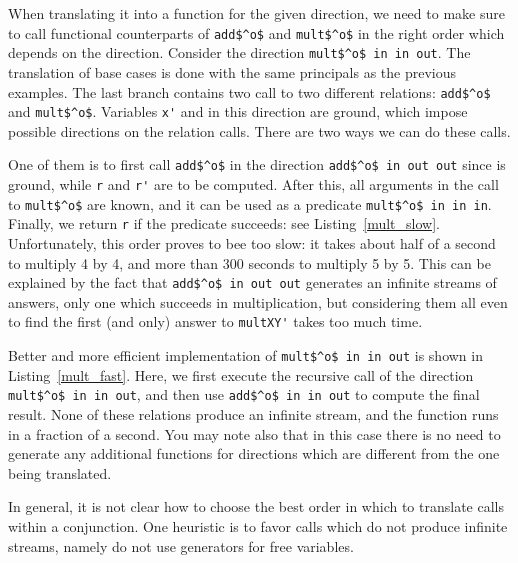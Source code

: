When translating it into a function for the given direction, we need to make sure to call functional counterparts of \lstinline{add$^o$} and \lstinline{mult$^o$} in the right order which depends on the direction.
Consider the direction \lstinline{mult$^o$ in in out}.
The translation of base cases is done with the same principals as the previous examples.
The last \conde branch contains two call to two different relations: \lstinline{add$^o$} and \lstinline{mult$^o$}.
Variables \lstinline{x'} and \y in this direction are ground, which impose possible directions on the relation calls.
There are two ways we can do these calls.

One of them is to first call \lstinline{add$^o$} in the direction \lstinline{add$^o$ in out out} since \y is ground, while \lstinline{r} and \lstinline{r'} are to be computed.
After this, all arguments in the call to \lstinline{mult$^o$} are known, and it can be used as a predicate \lstinline{mult$^o$ in in in}.
Finally, we return \lstinline{r} if the predicate succeeds: see Listing~\ref{mult_slow}.
Unfortunately, this order proves to bee too slow: it takes about half of a second to multiply 4 by 4, and more than 300 seconds to multiply 5 by 5.
This can be explained by the fact that \lstinline{add$^o$ in out out} generates an infinite streams of answers, only one which succeeds in multiplication, but considering them all even to find the first (and only) answer to \lstinline{multXY'} takes too much time.

Better and more efficient implementation of \lstinline{mult$^o$ in in out} is shown in Listing~\ref{mult_fast}.
Here, we first execute the recursive call of the direction \lstinline{mult$^o$ in in out}, and then use \lstinline{add$^o$ in in out} to compute the final result.
None of these relations produce an infinite stream, and the function runs in a fraction of a second.
You may note also that in this case there is no need to generate any additional functions for directions which are different from the one being translated.

In general, it is not clear how to choose the best order in which to translate calls within a conjunction.
One heuristic is to favor calls which do not produce infinite streams, namely do not use generators for free variables.


